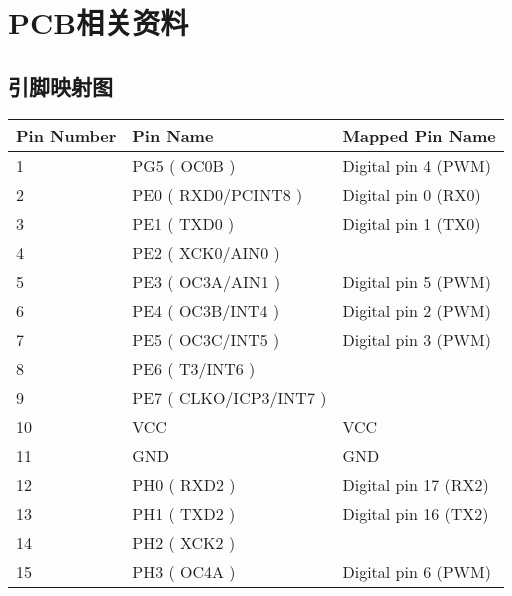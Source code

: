 \chapter{PCB相关资料}
\label{cha:Appendix-PCB}

\section{引脚映射图}
\label{sec:Pin2560}
\begin{longtable}[c]{|l|l|l|}
    \hline
    Pin Number & Pin Name                 & Mapped Pin Name       \\ \hline
    \endfirsthead
    \endhead
    1          & PG5 ( OC0B )             & Digital pin 4 (PWM)   \\ \hline
    2          & PE0 ( RXD0/PCINT8 )      & Digital pin 0 (RX0)   \\ \hline
    3          & PE1 ( TXD0 )             & Digital pin 1 (TX0)   \\ \hline
    4          & PE2 ( XCK0/AIN0 )        &                       \\ \hline
    5          & PE3 ( OC3A/AIN1 )        & Digital pin 5 (PWM)   \\ \hline
    6          & PE4 ( OC3B/INT4 )        & Digital pin 2 (PWM)   \\ \hline
    7          & PE5 ( OC3C/INT5 )        & Digital pin 3 (PWM)   \\ \hline
    8          & PE6 ( T3/INT6 )          &                       \\ \hline
    9          & PE7 ( CLKO/ICP3/INT7 )   &                       \\ \hline
    10         & VCC                      & VCC                   \\ \hline
    11         & GND                      & GND                   \\ \hline
    12         & PH0 ( RXD2 )             & Digital pin 17 (RX2)  \\ \hline
    13         & PH1 ( TXD2 )             & Digital pin 16 (TX2)  \\ \hline
    14         & PH2 ( XCK2 )             &                       \\ \hline
    15         & PH3 ( OC4A )             & Digital pin 6 (PWM)   \\ \hline

\end{longtable}
